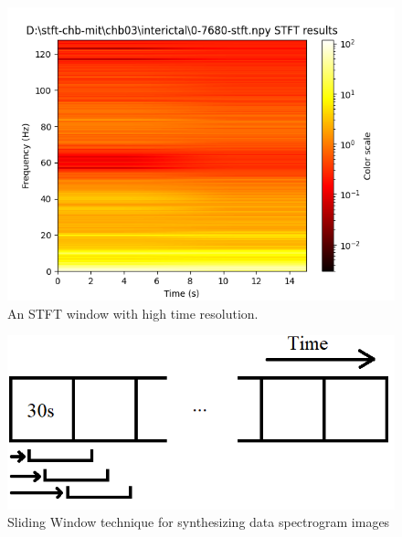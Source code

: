 \documentclass[12pt]{article}
\begin{document}
\begin{figure}[H]
\includegraphics[width=\textwidth]{stft2}
\centering
\caption{An STFT window with high time resolution.}
\label{fig:stft2}
\end{figure}

\begin{figure}[H]
\includegraphics[width=\textwidth]{slidingWindow}
\centering
\caption{Sliding Window technique for synthesizing data spectrogram images}
\label{fig:slidingWindow}
\end{figure}
\end{document}
